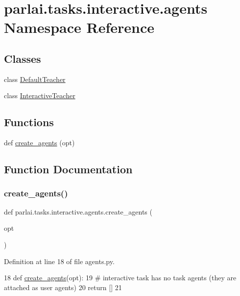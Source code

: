 \hypertarget{namespaceparlai_1_1tasks_1_1interactive_1_1agents}{}\section{parlai.\+tasks.\+interactive.\+agents Namespace Reference}
\label{namespaceparlai_1_1tasks_1_1interactive_1_1agents}
\subsection*{Classes}
\begin{DoxyCompactItemize}
\item 
class \hyperlink{classparlai_1_1tasks_1_1interactive_1_1agents_1_1DefaultTeacher}{Default\+Teacher}
\item 
class \hyperlink{classparlai_1_1tasks_1_1interactive_1_1agents_1_1InteractiveTeacher}{Interactive\+Teacher}
\end{DoxyCompactItemize}
\subsection*{Functions}
\begin{DoxyCompactItemize}
\item 
def \hyperlink{namespaceparlai_1_1tasks_1_1interactive_1_1agents_a3aec29f3c395d69303073d86d3802aa1}{create\+\_\+agents} (opt)
\end{DoxyCompactItemize}


\subsection{Function Documentation}
\mbox{\label{namespaceparlai_1_1tasks_1_1interactive_1_1agents_a3aec29f3c395d69303073d86d3802aa1}} 
\subsubsection{\texorpdfstring{create\+\_\+agents()}{create\_agents()}}
{\footnotesize\ttfamily def parlai.\+tasks.\+interactive.\+agents.\+create\+\_\+agents (\begin{DoxyParamCaption}\item[{}]{opt }\end{DoxyParamCaption})}



Definition at line 18 of file agents.\+py.


\begin{DoxyCode}
18 \textcolor{keyword}{def }\hyperlink{namespaceparlai_1_1tasks_1_1wizard__of__wikipedia_1_1agents_a3fb02e79313f0dbce37b5120cc9add1c}{create\_agents}(opt):
19     \textcolor{comment}{# interactive task has no task agents (they are attached as user agents)}
20     \textcolor{keywordflow}{return} []
21 \end{DoxyCode}
